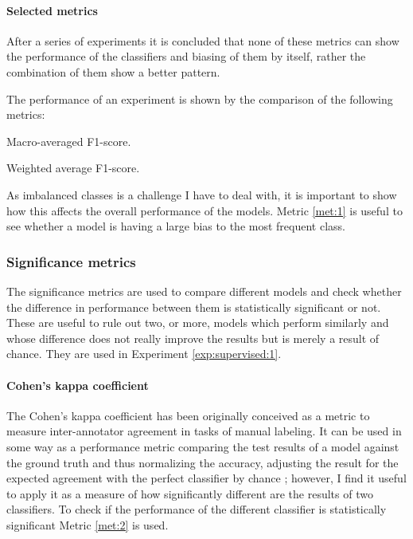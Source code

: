 \paragraph{Selected metrics}

After a series of experiments it is concluded that none of these metrics can
show the performance of the classifiers and biasing of them by itself, rather
the combination of them show a better pattern.

\begin{metric}\label{met:1}
  The performance of an experiment is shown by the comparison of the following
  metrics:
  \begin{enummet}
    \item Macro-averaged F1-score.
    \item Weighted average F1-score.
  \end{enummet}
\end{metric}

As imbalanced classes is a challenge I have to deal with, it is important to
show how this affects the overall performance of the models. Metric \ref{met:1}
is useful to see whether a model is having a large bias to the most frequent
class.

\subsubsection{Significance metrics}

The significance metrics are used to compare different models and check whether
the difference in performance between them is statistically significant or not.
These are useful to rule out two, or more, models which perform similarly and
whose difference does not really improve the results but is merely a result of
chance. They are used in Experiment \ref{exp:supervised:1}.

\paragraph{Cohen's kappa coefficient} The Cohen's kappa coefficient has been
originally conceived as a metric to measure inter-annotator agreement in tasks
of manual labeling. It can be used in some way as a performance metric
comparing the test results of a model against the ground truth and thus
normalizing the accuracy, adjusting the result for the expected agreement with
the perfect classifier by chance \cite{Cohn:aa}; however, I find it useful to
apply it as a measure of how significantly different are the results of two
classifiers. To check if the performance of the different classifier is
statistically significant Metric \ref{met:2} is used.


